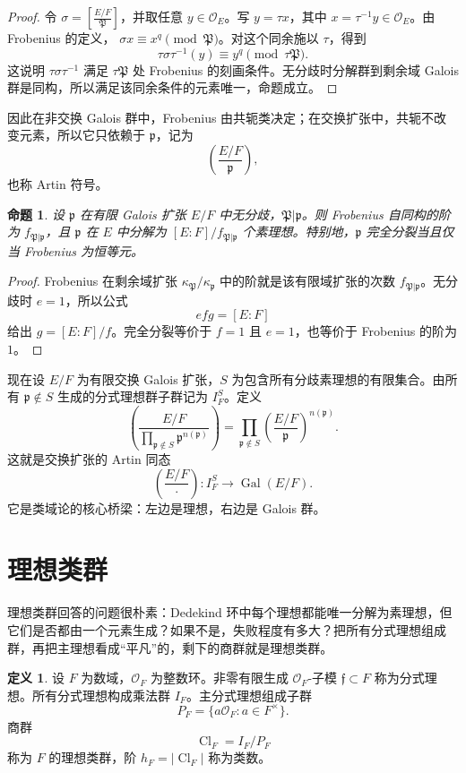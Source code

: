 \documentclass[11pt,a4paper,openany]{ctexbook}
\numberwithin{equation}{chapter}
\newcommand{\OF}{\mathcal{O}_F}
\newcommand{\Gal}{\operatorname{Gal}}
\newcommand{\Cl}{\operatorname{Cl}}
\theoremstyle{plain}
\newtheorem{proposition}[theorem]{命题}
\theoremstyle{definition}
\newtheorem{definition}[theorem]{定义}
\theoremstyle{remark}
\begin{document}
\begin{proof}
令 $\sigma=\left[\frac{E/F}{\mathfrak P}\right]$，并取任意
$y\in\mathcal O_E$。写 $y=\tau x$，其中 $x=\tau^{-1}y\in\mathcal O_E$。由
Frobenius 的定义，
$\sigma x\equiv x^q\pmod{\mathfrak P}$。对这个同余施以 $\tau$，得到
\[
\tau\sigma\tau^{-1}(y)\equiv y^q\pmod{\tau\mathfrak P}.
\]
这说明 $\tau\sigma\tau^{-1}$ 满足 $\tau\mathfrak P$ 处 Frobenius 的刻画条件。无分歧时分解群到剩余域 Galois 群是同构，所以满足该同余条件的元素唯一，命题成立。
\end{proof}

因此在非交换 Galois 群中，Frobenius 由共轭类决定；在交换扩张中，共轭不改变元素，所以它只依赖于 $\mathfrak p$，记为
\[
\left(\frac{E/F}{\mathfrak p}\right),
\]
也称 Artin 符号。

\begin{proposition}
设 $\mathfrak p$ 在有限 Galois 扩张 $E/F$ 中无分歧，$\mathfrak P|\mathfrak p$。则 Frobenius 自同构的阶为 $f_{\mathfrak P|\mathfrak p}$，且 $\mathfrak p$ 在 $E$ 中分解为 $[E:F]/f_{\mathfrak P|\mathfrak p}$ 个素理想。特别地，$\mathfrak p$ 完全分裂当且仅当 Frobenius 为恒等元。
\end{proposition}

\begin{proof}
Frobenius 在剩余域扩张 $\kappa_{\mathfrak P}/\kappa_{\mathfrak p}$ 中的阶就是该有限域扩张的次数 $f_{\mathfrak P|\mathfrak p}$。无分歧时 $e=1$，所以公式
\[
efg=[E:F]
\]
给出 $g=[E:F]/f$。完全分裂等价于 $f=1$ 且 $e=1$，也等价于 Frobenius 的阶为 $1$。
\end{proof}

现在设 $E/F$ 为有限交换 Galois 扩张，$S$ 为包含所有分歧素理想的有限集合。由所有 $\mathfrak p\notin S$ 生成的分式理想群子群记为 $I_F^S$。定义
\[
\left(\frac{E/F}{\prod_{\mathfrak p\notin S}\mathfrak p^{n(\mathfrak p)}}\right)
=\prod_{\mathfrak p\notin S}
\left(\frac{E/F}{\mathfrak p}\right)^{n(\mathfrak p)}.
\]
这就是交换扩张的 Artin 同态
\[
\left(\frac{E/F}{\cdot}\right):I_F^S\longrightarrow\Gal(E/F).
\]
它是类域论的核心桥梁：左边是理想，右边是 Galois 群。

\section{理想类群}

理想类群回答的问题很朴素：Dedekind 环中每个理想都能唯一分解为素理想，但它们是否都由一个元素生成？如果不是，失败程度有多大？把所有分式理想组成群，再把主理想看成“平凡”的，剩下的商群就是理想类群。

\begin{definition}
设 $F$ 为数域，$\OF$ 为整数环。非零有限生成 $\OF$-子模 $\mathfrak f\subset F$ 称为分式理想。所有分式理想构成乘法群 $I_F$。主分式理想组成子群
\[
P_F=\{a\OF:a\in F^\times\}.
\]
商群
\[
\Cl_F=I_F/P_F
\]
称为 $F$ 的理想类群，阶 $h_F=|\Cl_F|$ 称为类数。
\end{definition}
\end{document}

